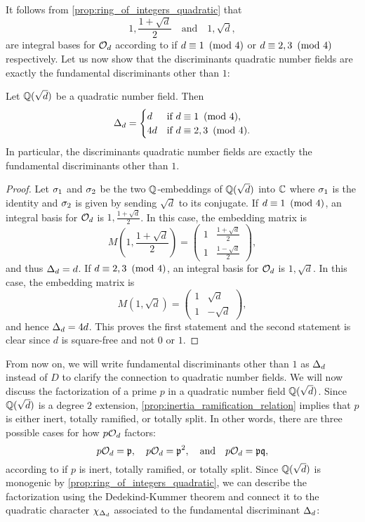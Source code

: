     It follows from \cref{prop:ring_of_integers_quadratic} that
    \[
      1,\frac{1+\sqrt{d}}{2} \quad \text{and} \quad 1,\sqrt{d},
    \]
    are integral bases for $\mathcal{O}_{d}$ according to if $d \equiv 1 \ \left(\text{mod }4\right)$ or $d \equiv 2,3 \ \left(\text{mod }4\right)$ respectively. Let us now show that the discriminants quadratic number fields are exactly the fundamental discriminants other than $1$:

    \begin{proposition}\label{prop:discriminant_quadratic}
      Let $\mathbb{Q}(\sqrt{d})$ be a quadratic number field. Then
      \[
        \Delta_{d} = \begin{cases} d & \text{if $d \equiv 1 \ \left(\text{mod }4\right)$}, \\ 4d & \text{if $d \equiv 2,3 \ \left(\text{mod }4\right)$}. \end{cases}
      \]
      In particular, the discriminants quadratic number fields are exactly the fundamental discriminants other than $1$.
    \end{proposition}
    \begin{proof}
      Let $\sigma_{1}$ and $\sigma_{2}$ be the two $\mathbb{Q}$-embeddings of $\mathbb{Q}(\sqrt{d})$ into $\mathbb{C}$ where $\sigma_{1}$ is the identity and $\sigma_{2}$ is given by sending $\sqrt{d}$ to its conjugate. If $d \equiv 1 \ \left(\text{mod }4\right)$, an integral basis for $\mathcal{O}_{d}$ is $1,\frac{1+\sqrt{d}}{2}$. In this case, the embedding matrix is
      \[
        M\left(1,\frac{1+\sqrt{d}}{2}\right) = \begin{pmatrix} 1 & \frac{1+\sqrt{d}}{2} \\ 1 & \frac{1-\sqrt{d}}{2} \end{pmatrix},
      \]
      and thus $\Delta_{d} = d$. If $d \equiv 2,3 \ \left(\text{mod }4\right)$, an integral basis for $\mathcal{O}_{d}$ is $1,\sqrt{d}$. In this case, the embedding matrix is
      \[
        M(1,\sqrt{d}) = \begin{pmatrix} 1 & \sqrt{d} \\ 1 & -\sqrt{d} \end{pmatrix},
      \]
      and hence $\Delta_{d} = 4d$. This proves the first statement and the second statement is clear since $d$ is square-free and not $0$ or $1$.
    \end{proof}

    From now on, we will write fundamental discriminants other than $1$ as $\Delta_{d}$ instead of $D$ to clarify the connection to quadratic number fields. We will now discuss the factorization of a prime $p$ in a quadratic number field $\mathbb{Q}(\sqrt{d})$. Since $\mathbb{Q}(\sqrt{d})$ is a degree $2$ extension, \cref{prop:inertia_ramification_relation} implies that $p$ is either inert, totally ramified, or totally split. In other words, there are three possible cases for how $p\mathcal{O}_{d}$ factors:
    \[
      p\mathcal{O}_{d} = \mathfrak{p}, \quad p\mathcal{O}_{d} = \mathfrak{p}^{2}, \quad \text{and} \quad p\mathcal{O}_{d} = \mathfrak{p}\mathfrak{q},
    \]
    according to if $p$ is inert, totally ramified, or totally split. Since $\mathbb{Q}(\sqrt{d})$ is monogenic by \cref{prop:ring_of_integers_quadratic}, we can describe the factorization using the Dedekind-Kummer theorem and connect it to the quadratic character $\chi_{\Delta_{d}}$ associated to the fundamental discriminant $\Delta_{d}$:

